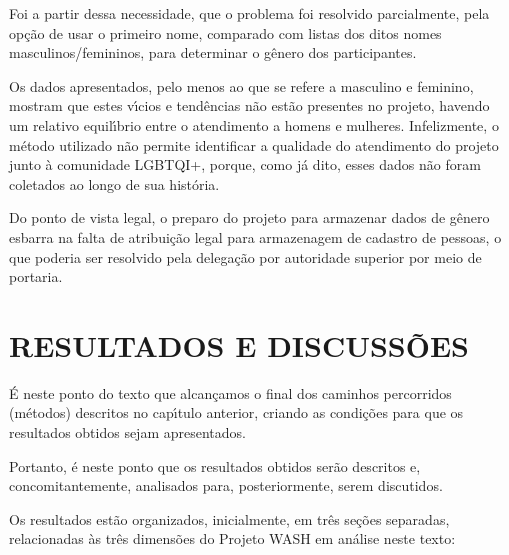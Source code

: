 \documentclass[
12pt,		%
openright,	%
twoside,  %
a4paper,			%
chapter=TITLE,		%
english,			%
french,				%
spanish,			%
brazil				%
]{USPSC-classe/USPSC_RedarTex}
\begin{document}
Foi a partir dessa necessidade, que o problema foi resolvido parcialmente, pela op\c{c}\~ao de usar o primeiro nome, comparado com listas dos ditos nomes masculinos/femininos, para determinar o g\^enero dos participantes.








Os dados apresentados, pelo menos ao que se refere a masculino e feminino, mostram que estes v\'{\i}cios e tend\^encias n\~ao est\~ao presentes no projeto, havendo um relativo equil\'{\i}brio entre o atendimento a homens e mulheres. Infelizmente, o m\'etodo utilizado n\~ao permite identificar a qualidade do atendimento do projeto junto \`a comunidade LGBTQI+, porque, como j\'a dito, esses dados n\~ao foram coletados ao longo de sua hist\'oria.








Do ponto de vista legal, o preparo do projeto para armazenar dados de g\^enero esbarra na falta de atribui\c{c}\~ao legal para armazenagem de cadastro de pessoas, o que poderia ser resolvido pela delega\c{c}\~ao por autoridade superior por meio de portaria.








\chapter[RESULTADOS E DISCUSS\~OES]{RESULTADOS E DISCUSS\~OES}\label{RESULTADOS E DISCUSS\~OES}
\'E neste ponto do texto que alcan\c{c}amos o final dos caminhos percorridos (m\'etodos) descritos no cap\'{\i}tulo anterior, criando as condi\c{c}\~oes para que os resultados obtidos sejam apresentados.








Portanto, \'e neste ponto que os resultados obtidos ser\~ao descritos e, concomitantemente, analisados para, posteriormente, serem discutidos.








Os resultados est\~ao organizados, inicialmente, em tr\^es se\c{c}\~oes separadas, relacionadas \`as tr\^es dimens\~oes do Projeto WASH em an\'alise neste texto:
\end{document}
